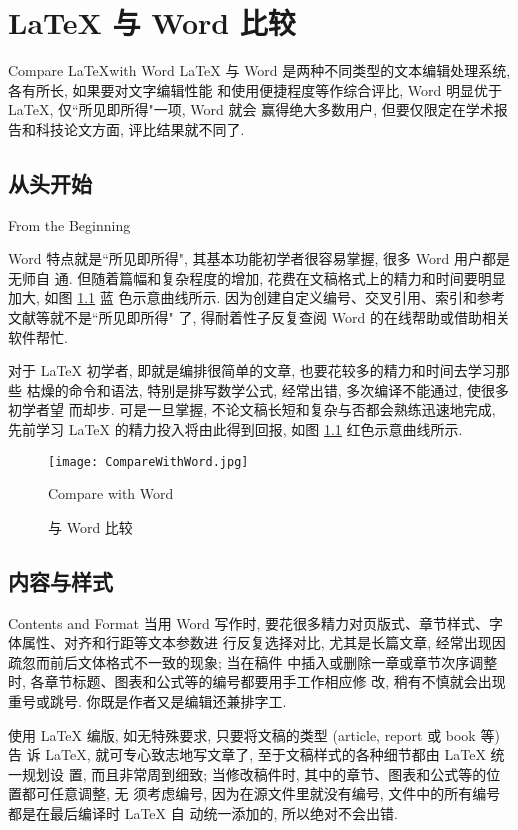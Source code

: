 
\chapter{\LaTeX{} 与 Word 比较}{Compare \LaTeX with Word}
\LaTeX{}\index{\LaTeX} 与 Word 是两种不同类型的文本编辑处理系统, 各有所长, 如果要对文字编辑性能
和使用便捷程度等作综合评比, Word 明显优于 \LaTeX\index{\LaTeX}, 仅``所见即所得"一项, Word 就会
赢得绝大多数用户, 但要仅限定在学术报告和科技论文方面, 评比结果就不同了.

\section{从头开始}{From the Beginning}

Word 特点就是``所见即所得", 其基本功能初学者很容易掌握, 很多 Word 用户都是无师自
通. 但随着篇幅和复杂程度的增加, 花费在文稿格式上的精力和时间要明显加大, 如图
\ref{fig:CompareWithWord} 蓝
色示意曲线所示. 因为创建自定义编号、交叉引用、索引和参考文献等就不是``所见即所得"
了, 得耐着性子反复查阅 Word 的在线帮助或借助相关软件帮忙.

对于 \LaTeX{}\index{\LaTeX} 初学者, 即就是编排很简单的文章, 也要花较多的精力和时间去学习那些
枯燥的命令和语法, 特别是排写数学公式, 经常出错, 多次编译不能通过, 使很多初学者望
而却步. 可是一旦掌握, 不论文稿长短和复杂与否都会熟练迅速地完成, 先前学习 \LaTeX{}\index{\LaTeX}
的精力投入将由此得到回报, 如图 \ref{fig:CompareWithWord} 红色示意曲线所示.

\begin{figure}
  \centering
  \texttt{[image: CompareWithWord.jpg]}\\
  \caption{与 Word 比较}{Compare with Word}\label{fig:CompareWithWord}
\end{figure}

\section{内容与样式}{Contents and Format}
当用 Word 写作时, 要花很多精力对页版式、章节样式、字体属性、对齐和行距等文本参数进
行反复选择对比, 尤其是长篇文章, 经常出现因疏忽而前后文体格式不一致的现象; 当在稿件
中插入或删除一章或章节次序调整时, 各章节标题、图表和公式等的编号都要用手工作相应修
改, 稍有不慎就会出现重号或跳号. 你既是作者又是编辑还兼排字工.

使用 \LaTeX{}\index{\LaTeX} 编版, 如无特殊要求, 只要将文稿的类型 (article, report 或 book 等) 告
诉 \LaTeX\index{\LaTeX}, 就可专心致志地写文章了, 至于文稿样式的各种细节都由 \LaTeX{}\index{\LaTeX} 统一规划设
置, 而且非常周到细致; 当修改稿件时, 其中的章节、图表和公式等的位置都可任意调整, 无
须考虑编号, 因为在源文件里就没有编号, 文件中的所有编号都是在最后编译时 \LaTeX{}\index{\LaTeX} 自
动统一添加的, 所以绝对不会出错.

